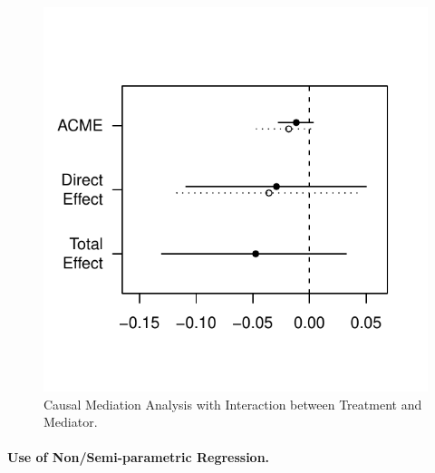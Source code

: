 \documentclass[11pt,letterpaper]{article}
\theoremstyle{plain}
\begin{document}
\begin{figure}[t]
\vspace{-.5in}
\begin{center}
\includegraphics[scale=.8]{plot-mediate-int.pdf}
\end{center}
\vspace{-.5in}
\caption{Causal Mediation Analysis with Interaction
between Treatment and Mediator.
  \label{fig:plot.mediate.int}}
\end{figure}


\paragraph{Use of Non/Semi-parametric Regression.}
\end{document}
